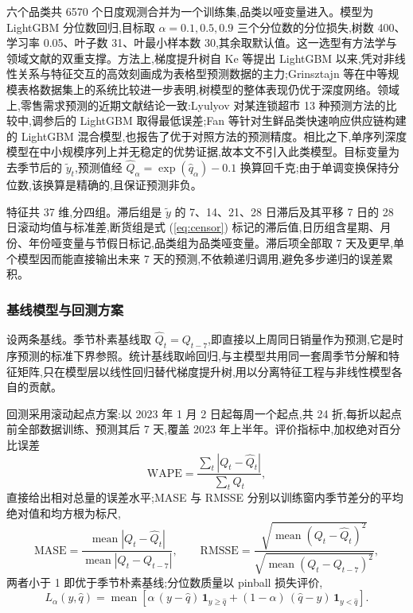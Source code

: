 六个品类共 6570 个日度观测合并为一个训练集,品类以哑变量进入。模型为 LightGBM 分位数回归,目标取 $\alpha=0.1,0.5,0.9$ 三个分位数的分位损失,树数 400、学习率 0.05、叶子数 31、叶最小样本数 30,其余取默认值。这一选型有方法学与领域文献的双重支撑。方法上,梯度提升树自 Ke 等提出 LightGBM 以来\cite{ke2017},凭对非线性关系与特征交互的高效刻画成为表格型预测数据的主力;Grinsztajn 等在中等规模表格数据集上的系统比较进一步表明,树模型的整体表现仍优于深度网络\cite{grinsztajn2022}。领域上,零售需求预测的近期文献结论一致:Lyulyov 对某连锁超市 13 种预测方法的比较中,调参后的 LightGBM 取得最低误差\cite{lyulyov2024};Fan 等针对生鲜品类快速响应供应链构建的 LightGBM 混合模型,也报告了优于对照方法的预测精度\cite{fan2024}。相比之下,单序列深度模型在中小规模序列上并无稳定的优势证据,故本文不引入此类模型。目标变量为去季节后的 $\tilde{y}_t$,预测值经 $\hat{Q}_\alpha=\exp(\hat{q}_\alpha)-0.1$ 换算回千克;由于单调变换保持分位数,该换算是精确的,且保证预测非负。

特征共 37 维,分四组。滞后组是 $\tilde{y}$ 的 7、14、21、28 日滞后及其平移 7 日的 28 日滚动均值与标准差,断货组是式 (\ref{eq:censor}) 标记的滞后值,日历组含星期、月份、年份哑变量与节假日标记,品类组为品类哑变量。滞后项全部取 7 天及更早,单个模型因而能直接输出未来 7 天的预测,不依赖递归调用,避免多步递归的误差累积。

\subsubsection{基线模型与回测方案}
\label{subsec:bt}

设两条基线。季节朴素基线取 $\hat{Q}_t = Q_{t-7}$,即直接以上周同日销量作为预测,它是时序预测的标准下界参照。统计基线取岭回归,与主模型共用同一套周季节分解和特征矩阵,只在模型层以线性回归替代梯度提升树,用以分离特征工程与非线性模型各自的贡献。

回测采用滚动起点方案:以 2023 年 1 月 2 日起每周一个起点,共 24 折,每折以起点前全部数据训练、预测其后 7 天,覆盖 2023 年上半年。评价指标中,加权绝对百分比误差
\begin{equation}
  \mathrm{WAPE}=\frac{\sum_t \left|Q_t-\hat{Q}_t\right|}{\sum_t Q_t},
\end{equation}
直接给出相对总量的误差水平;MASE 与 RMSSE 分别以训练窗内季节差分的平均绝对值和均方根为标尺,
\begin{equation}
  \mathrm{MASE}=\frac{\operatorname*{mean}\left|Q_t-\hat{Q}_t\right|}
  {\operatorname*{mean}\left|Q_t-Q_{t-7}\right|},
  \qquad
  \mathrm{RMSSE}=\frac{\sqrt{\operatorname*{mean}\left(Q_t-\hat{Q}_t\right)^2}}
  {\sqrt{\operatorname*{mean}\left(Q_t-Q_{t-7}\right)^2}},
\end{equation}
两者小于 1 即优于季节朴素基线;分位数质量以 pinball 损失评价,
\begin{equation}
  L_\alpha(y,\hat{q})=\operatorname*{mean}\left[\alpha\,(y-\hat{q})\,\mathbf{1}_{y\ge\hat{q}}+(1-\alpha)\,(\hat{q}-y)\,\mathbf{1}_{y<\hat{q}}\right].
\end{equation}

